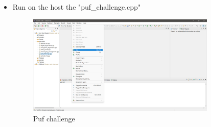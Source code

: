 \begin{itemize}
\item {Run on the host the "puf\_challenge.cpp"}
\begin{figure}[H]
\centering
  \includegraphics[width=9cm]{../../images/puf_challenge.png}
  \caption{Puf challenge}
  \label{fig:Puf challenge}
\end{figure}

\end{itemize}




